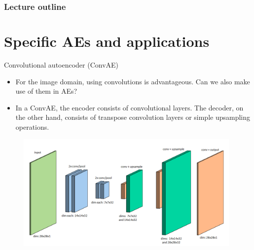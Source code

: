 
 







\begin{frame}
\frametitle{Lecture outline}
\tableofcontents
\end{frame}

\section{Specific AEs and applications}
\begin{vbframe}{Convolutional autoencoder (ConvAE)}
  \begin{itemize}
    \item %
    For the image domain, using convolutions is advantageous. Can we also make use of them in AEs?     
    \item In a ConvAE, the encoder consists of convolutional layers. The decoder, on the other hand, consists of transpose convolution layers or simple upsampling operations.
  \end{itemize}
\framebreak
  \begin{figure}
    \centering
    \includegraphics[width=11cm]{plots/convolutional_autoencoder3.png}

\end{figure}
\end{vbframe}
